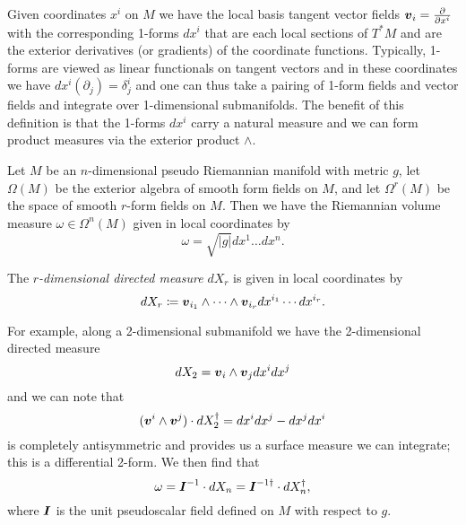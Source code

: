 Given coordinates $x^i$ on $M$ we have the local basis tangent vector fields $\boldsymbol{v}_i=\frac{\partial}{\partial x^i}$ with the corresponding 1-forms $dx^i$ that are each local sections of $T^*M$ and are the exterior derivatives (or gradients) of the coordinate functions.  Typically, 1-forms are viewed as linear functionals on tangent vectors and in these coordinates we have $dx^i  (\partial_j) = \delta^i_j$ and one can thus take a pairing of 1-form fields and vector fields and integrate over 1-dimensional submanifolds. The benefit of this definition is that the 1-forms $dx^i$ carry a natural measure and we can form product measures via the exterior product $\wedge$.

Let $M$ be an $n$-dimensional pseudo Riemannian manifold with metric $g$, let $\Omega(M)$ be the exterior algebra of smooth form fields on $M$, and let $\Omega^r(M)$ be the space of smooth $r$-form fields on $M$. Then we have the Riemannian volume measure $\omega \in \Omega^n(M)$ given in local coordinates by
\begin{equation}
\omega = \sqrt{|g|} dx^1\dots dx^n.
\end{equation}
\begin{definition}
The \emph{$r$-dimensional directed measure} $dX_r$ is given in local coordinates by
\begin{equation}
    dX_r \coloneqq \boldsymbol{v}_{i_1} \wedge \cdots \wedge \boldsymbol{v}_{i_r} dx^{i_1} \cdots dx^{i_r}. 
\end{equation}
\end{definition}
For example, along a 2-dimensional submanifold we have the 2-dimensional directed measure 
\begin{equation}
    dX_2 = \boldsymbol{v}_i \wedge \boldsymbol{v}_j dx^i dx^j
\end{equation}
and we can note that 
\begin{equation}
(\boldsymbol{v}^i \wedge \boldsymbol{v}^j)\cdot dX_2^\dagger = dx^idx^j - dx^j dx^i
\end{equation}
is completely antisymmetric and provides us a surface measure we can integrate; this is a differential 2-form. We then find that
\begin{equation}
\label{eq:volume_form}
\omega = \boldsymbol{I}^{-1} \cdot dX_n = \boldsymbol{I}^{-1 \dagger} \cdot dX_n^\dagger,
\end{equation}
where $\boldsymbol{I}$ is the unit pseudoscalar field defined on $M$ with respect to $g$. 

